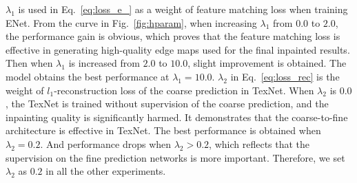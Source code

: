 $\lambda_1$ is used in Eq.~\eqref{eq:loss_e_} as a weight of feature matching loss when training ENet. %
From the curve in Fig.~\ref{fig:hparam}, when increasing $\lambda_1$ from $0.0$ to $2.0$, the performance gain is obvious, which proves that the feature matching loss is effective in
generating high-quality edge maps used for the final inpainted results. 
Then when $\lambda_1$ is increased from $2.0$ to $10.0$, slight improvement is obtained.
The model obtains the best performance at $\lambda_1=10.0$.
%
$\lambda_2$ in Eq.~\eqref{eq:loss_rec} is the weight of $l_1$-reconstruction loss of the coarse prediction in TexNet. 
When $\lambda_2$ is $0.0$, the TexNet is trained without supervision of the coarse prediction, and the inpainting quality is significantly harmed.
It demonstrates that the coarse-to-fine architecture is effective in TexNet. The best performance is obtained when $\lambda_2=0.2$. And performance drops when $\lambda_2>0.2$, which reflects that the supervision on the fine prediction networks is more important.
Therefore, we set $\lambda_2$ as $0.2$ in all the other experiments.






 

